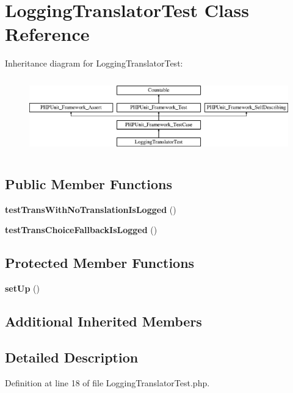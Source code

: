 \section{Logging\+Translator\+Test Class Reference}
\label{class_symfony_1_1_component_1_1_translation_1_1_tests_1_1_logging_translator_test}
Inheritance diagram for Logging\+Translator\+Test\+:\begin{figure}[H]
\begin{center}
\leavevmode
\includegraphics[height=3.303835cm]{class_symfony_1_1_component_1_1_translation_1_1_tests_1_1_logging_translator_test}
\end{center}
\end{figure}
\subsection*{Public Member Functions}
\begin{DoxyCompactItemize}
\item 
{\bf test\+Trans\+With\+No\+Translation\+Is\+Logged} ()
\item 
{\bf test\+Trans\+Choice\+Fallback\+Is\+Logged} ()
\end{DoxyCompactItemize}
\subsection*{Protected Member Functions}
\begin{DoxyCompactItemize}
\item 
{\bf set\+Up} ()
\end{DoxyCompactItemize}
\subsection*{Additional Inherited Members}


\subsection{Detailed Description}


Definition at line 18 of file Logging\+Translator\+Test.\+php.



